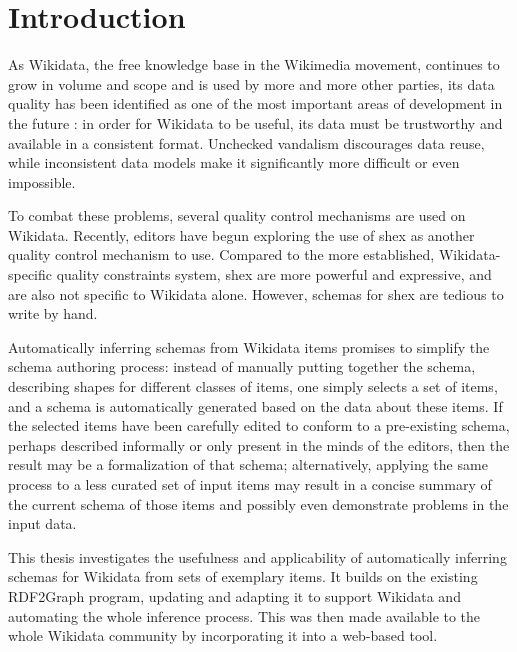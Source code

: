 
\chapter{Introduction}
\label{ch:Introduction}

As Wikidata,
the free knowledge base in the Wikimedia movement,
continues to grow in volume and scope and is used by more and more other parties, %
its data quality has been identified as one of the most important areas of development in the future \cite{wdcon2017-sotp}: %
in order for Wikidata to be useful,
its data must be trustworthy and available in a consistent format.
Unchecked vandalism discourages data reuse,
while inconsistent data models make it significantly more difficult or even impossible.

To combat these problems,
several quality control mechanisms are used on Wikidata.
Recently, editors have begun exploring the use of \acrlong{shex}
as another quality control mechanism to use.
Compared to the more established, Wikidata-specific quality constraints system,
\acrlong{shex} are more powerful and expressive,
and are also not specific to Wikidata alone.
However, schemas for \acrlong{shex} are tedious to write by hand.

Automatically inferring schemas from Wikidata items
promises to simplify the schema authoring process:
instead of manually putting together the schema,
describing shapes for different classes of items,
one simply selects a set of items,
and a schema is automatically generated based on the data about these items.
If the selected items have been carefully edited
to conform to a pre-existing schema,
perhaps described informally or only present in the minds of the editors,
then the result may be a formalization of that schema;
alternatively, applying the same process to a less curated set of input items
may result in a concise summary of the current schema of those items %
and possibly even demonstrate problems in the input data.


This thesis investigates the usefulness and applicability
of automatically inferring schemas for Wikidata from sets of exemplary items.
It builds on the existing RDF2Graph \cite{vanDam2015} program,
updating and adapting it to support Wikidata
and automating the whole inference process.
This was then made available to the whole Wikidata community %
by incorporating it into a web-based tool.

